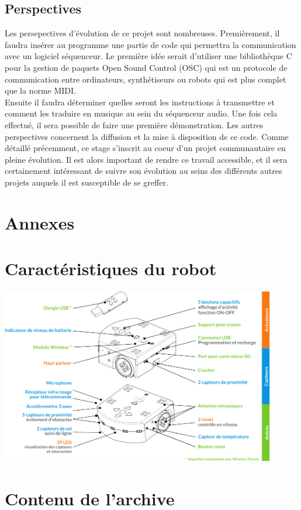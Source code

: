 \documentclass[a4paper, 12pt]{report}
\begin{document}
\section{Perspectives}
Les persepectives d'évolution de ce projet sont nombreuses. Premièrement, il faudra insérer au programme une partie de code qui permettra la communication avec un logiciel séquenceur. Le première idée serait d'utiliser une bibliothèque C pour la gestion de paquets Open Sound Control (OSC) qui est un protocole de communication entre ordinateurs, synthétiseurs ou robots qui est plus complet que la norme MIDI.\\
Ensuite il faudra déterminer quelles seront les instructions à transmettre et comment les traduire en musique au sein du séquenceur audio. Une fois cela effectué, il sera possible de faire une première démonstration.
Les autres perspectives concernent la diffusion et la mise à disposition de ce code. Comme détaillé précemment, ce stage s'inscrit au coeur d'un projet communautaire en pleine évolution. Il est alors important de rendre ce travail accessible, et il sera certainement intéressant de suivre son évolution au seins des différents autres projets auquels il est susceptible de se greffer.


\nocite{*}

\chapter*{Annexes}
\chapter*{Caractéristiques du robot}
\includegraphics[width=0.9\textwidth]{Thymio_details.png}
\chapter*{Contenu de l'archive}
\end{document}
